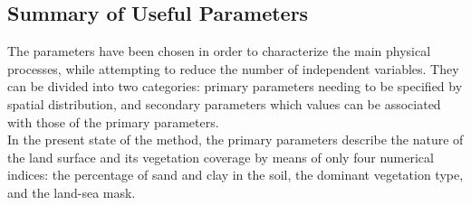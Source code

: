 {%


\clearpage

\subsection{Summary of Useful Parameters}

The parameters have been chosen in order to characterize the
main physical processes, while attempting to reduce the number
of independent variables.  They can be divided into two
categories:  primary parameters needing to be specified by
spatial distribution, and secondary parameters which values
can be associated with those of the primary parameters.
\\

In the present state of the method,
the primary parameters describe the nature of the land surface
and its vegetation coverage by means of only four numerical
indices:  the percentage of
sand and clay in the soil, the dominant vegetation type,
and the land-sea mask.\\

}
